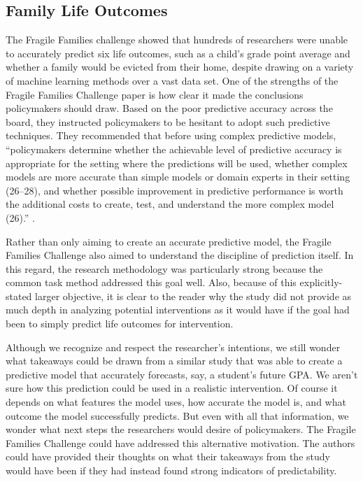 \documentclass[12pt]{article}
\begin{document}
    \subsection{Family Life Outcomes}
        The Fragile Families challenge showed that hundreds of researchers were unable to accurately predict six life outcomes, such as a child’s grade point average and whether a family would be evicted from their home, despite drawing on a variety of machine learning methods over a vast data set. One of the strengths of the Fragile Families Challenge paper is how clear it made the conclusions policymakers should draw. Based on the poor predictive accuracy across the board, they instructed policymakers to be hesitant to adopt such predictive techniques. They recommended that before using complex predictive models, ``policymakers determine whether the achievable level of predictive accuracy is appropriate for the setting where the predictions will be used, whether complex models are more accurate than simple models or domain experts in their setting (26–28), and whether possible improvement in predictive performance is worth the additional costs to create, test, and understand the more complex model (26).'' \cite{fragilefamilies}.

        Rather than only aiming to create an accurate predictive model, the Fragile Families Challenge also aimed to understand the discipline of prediction itself. In this regard, the research methodology was particularly strong because the common task method addressed this goal well. Also, because of this explicitly-stated larger objective, it is clear to the reader why the study did not provide as much depth in analyzing potential interventions as it would have if the goal had been to simply predict life outcomes for intervention. 
        
        Although we recognize and respect the researcher's intentions, we still wonder what takeaways could be drawn from a similar study that was able to create a predictive model that accurately forecasts, say, a student's future GPA. We aren't sure how this prediction could be used in a realistic intervention. Of course it depends on what features the model uses, how accurate the model is, and what outcome the model successfully predicts. But even with all that information, we wonder what next steps the researchers would desire of policymakers. The Fragile Families Challenge could have addressed this alternative motivation. The authors could have provided their thoughts on what their takeaways from the study would have been if they had instead found strong indicators of predictability. 
        
\end{document}
